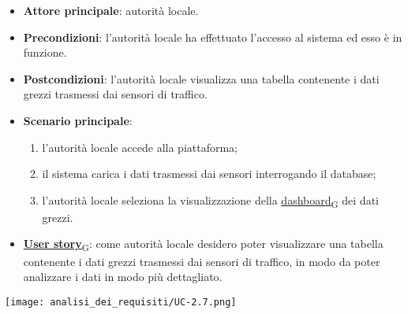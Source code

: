 \begin{itemize}
	\item \textbf{Attore principale}: autorità locale.
	\item \textbf{Precondizioni}: l'autorità locale ha effettuato l'accesso al sistema ed esso è in funzione.
	\item \textbf{Postcondizioni}: l'autorità locale visualizza una tabella contenente i dati grezzi trasmessi dai sensori di traffico.
	\item \textbf{Scenario principale}:
	      \begin{enumerate}
		      \item l'autorità locale accede alla piattaforma;
		      \item il sistema carica i dati trasmessi dai sensori interrogando il database;
		      \item l'autorità locale seleziona la visualizzazione della \href{https://7last.github.io/docs/rtb/documentazione-interna/glossario\#dashboard}{dashboard\textsubscript{G}} dei dati grezzi.
	      \end{enumerate}
	\item \href{https://7last.github.io/docs/rtb/documentazione-interna/glossario\#user-story}{\textbf{User story}\textsubscript{G}}:
	      come autorità locale desidero poter visualizzare una tabella contenente i dati grezzi trasmessi dai sensori di traffico,
	      in modo da poter analizzare i dati in modo più dettagliato.
\end{itemize}
\begin{center}
	\texttt{[image: analisi\_dei\_requisiti/UC-2.7.png]}
\end{center}
\newpage
{}
